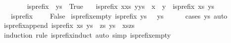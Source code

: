 \begin{isabellebody}
\ \ \ \isanewline
\ \ \ \ {\isachardoublequoteopen}is{\isacharunderscore}{\kern0pt}prefix\ {\isacharbrackleft}{\kern0pt}{\isacharbrackright}{\kern0pt}\ ys\ {\isacharequal}{\kern0pt}\ True{\isachardoublequoteclose}\isanewline
\ \ {\isacharbar}{\kern0pt}\ {\isachardoublequoteopen}is{\isacharunderscore}{\kern0pt}prefix\ {\isacharparenleft}{\kern0pt}x{\isacharhash}{\kern0pt}xs{\isacharparenright}{\kern0pt}\ {\isacharparenleft}{\kern0pt}y{\isacharhash}{\kern0pt}ys{\isacharparenright}{\kern0pt}\ {\isacharequal}{\kern0pt}\ {\isacharparenleft}{\kern0pt}{\isacharparenleft}{\kern0pt}x\ {\isacharequal}{\kern0pt}\ y{\isacharparenright}{\kern0pt}\ {\isasymand}\ is{\isacharunderscore}{\kern0pt}prefix\ xs\ ys{\isacharparenright}{\kern0pt}{\isachardoublequoteclose}\isanewline
\ \ {\isacharbar}{\kern0pt}\ {\isachardoublequoteopen}is{\isacharunderscore}{\kern0pt}prefix\ \ {\isacharunderscore}{\kern0pt}\ {\isacharunderscore}{\kern0pt}\ {\isacharequal}{\kern0pt}\ False{\isachardoublequoteclose}\isanewline
\isanewline
{}\isamarkupfalse%
\ is{\isacharunderscore}{\kern0pt}prefix{\isacharunderscore}{\kern0pt}empty{\isacharcolon}{\kern0pt}\ {\isachardoublequoteopen}is{\isacharunderscore}{\kern0pt}prefix\ ys\ {\isacharbrackleft}{\kern0pt}{\isacharbrackright}{\kern0pt}\ {\isasymLongrightarrow}\ ys\ {\isacharequal}{\kern0pt}\ {\isacharbrackleft}{\kern0pt}{\isacharbrackright}{\kern0pt}{\isachardoublequoteclose}\isanewline
%
\isadelimproof
\ \ %
\endisadelimproof
%
\isatagproof
{}\isamarkupfalse%
\ {\isacharparenleft}{\kern0pt}cases\ ys{\isacharparenright}{\kern0pt}\ auto%
\endisatagproof
{\isafoldproof}%
%
\isadelimproof
\isanewline
%
\endisadelimproof
\isanewline
{}\isamarkupfalse%
\ is{\isacharunderscore}{\kern0pt}prefix{\isacharunderscore}{\kern0pt}append{\isacharcolon}{\kern0pt}\ {\isachardoublequoteopen}is{\isacharunderscore}{\kern0pt}prefix\ xs\ ys\ {\isasymLongrightarrow}\ {\isasymexists}zs{\isachardot}{\kern0pt}\ ys\ {\isacharequal}{\kern0pt}\ xs{\isacharat}{\kern0pt}zs{\isachardoublequoteclose}\isanewline
%
\isadelimproof
\ \ %
\endisadelimproof
%
\isatagproof
{}\isamarkupfalse%
\ {\isacharparenleft}{\kern0pt}induction\ rule{\isacharcolon}{\kern0pt}\ is{\isacharunderscore}{\kern0pt}prefix{\isachardot}{\kern0pt}induct{\isacharparenright}{\kern0pt}\ {\isacharparenleft}{\kern0pt}auto\ simp{\isacharcolon}{\kern0pt}\ is{\isacharunderscore}{\kern0pt}prefix{\isacharunderscore}{\kern0pt}empty{\isacharparenright}{\kern0pt}%
\endisatagproof
{\isafoldproof}%
%
\isadelimproof
\isanewline
%
\endisadelimproof

\end{isabellebody}
